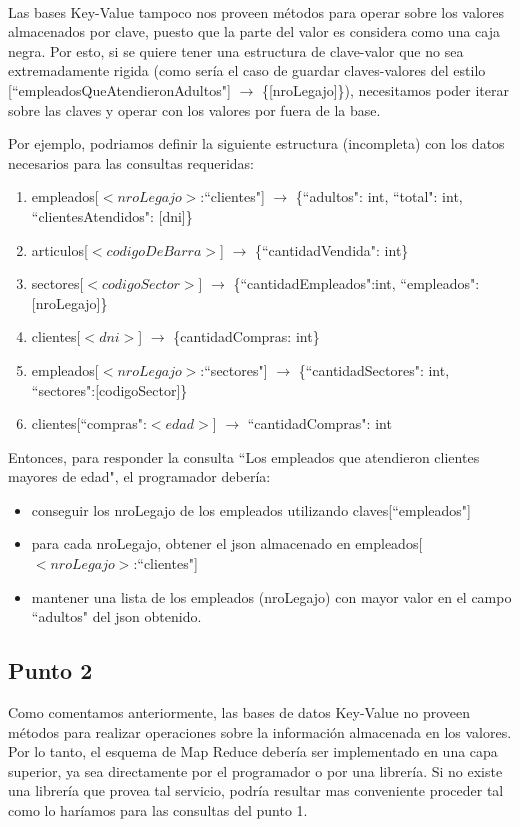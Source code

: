 ~

Las bases Key-Value tampoco nos proveen métodos para operar sobre los valores almacenados por clave,
puesto que la parte del valor es considera como una caja negra. Por esto, si se quiere tener
una estructura de clave-valor que no sea extremadamente rigida (como sería el caso
de guardar claves-valores del estilo [``empleadosQueAtendieronAdultos"] $\rightarrow$ \{[nroLegajo]\}),
necesitamos poder iterar sobre las claves y operar con los valores por fuera de la base.

Por ejemplo, podriamos definir la siguiente estructura (incompleta) con los datos necesarios para las consultas requeridas:
\begin{enumerate}
\item empleados[$<nroLegajo>$:``clientes"] $\rightarrow$ \{``adultos": int, ``total": int, ``clientesAtendidos": [dni]\}
\item articulos[$<codigoDeBarra>$] $\rightarrow$ \{``cantidadVendida": int\}
\item sectores[$<codigoSector>$] $\rightarrow$ \{``cantidadEmpleados":int, ``empleados":[nroLegajo]\}
\item clientes[$<dni>$] $\rightarrow$ \{cantidadCompras: int\}
\item empleados[$<nroLegajo>$:``sectores"] $\rightarrow$ \{``cantidadSectores": int, ``sectores":[codigoSector]\}
\item clientes[``compras":$<edad>$] $\rightarrow$ {``cantidadCompras": int}
\end{enumerate}

Entonces, para responder la consulta ``Los empleados que atendieron clientes mayores de edad", el programador debería:

\begin{itemize}
\item conseguir los nroLegajo de los empleados utilizando claves[``empleados"]
\item para cada nroLegajo, obtener el json almacenado en empleados[$<nroLegajo>$:``clientes"]
\item mantener una lista de los empleados (nroLegajo) con mayor valor en el campo ``adultos" del json obtenido.
\end{itemize}

\subsection{Punto 2}
Como comentamos anteriormente, las bases de datos Key-Value no proveen métodos para realizar operaciones sobre la información almacenada
en los valores. Por lo tanto, el esquema de Map Reduce debería ser implementado en una capa superior, ya sea directamente por el programador o por una
librería. Si no existe una librería que provea tal servicio, podría resultar mas conveniente proceder
tal como lo haríamos para las consultas del punto 1.


